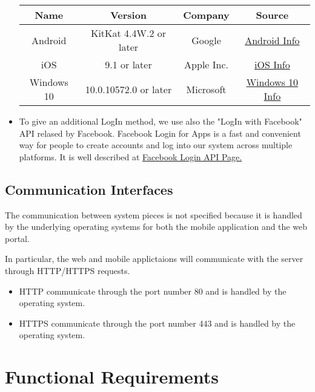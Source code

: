 \documentclass{report}
\begin{document}
\begin{itemize}
\begin{center}
\begin{table}[h!]
\begin{center}
								\begin{tabular}{cccc}
									\toprule
									\textbf{Name} & \textbf{Version} & \textbf{Company} & \textbf{Source}\\
									\midrule
									Android & KitKat 4.4W.2 or later & Google & \href{https://www.android.com}{Android Info}\\
									\midrule
									iOS & 9.1 or later & Apple Inc. & \href{http://www.apple.com/ios/}{iOS Info}\\
									\midrule
									Windows 10 & 10.0.10572.0 or later & Microsoft & \href{http://www.microsoft.com/it-it/mobile/windows10/?dcmpid=omc-org-globalsite.globalredirect}{Windows 10 Info}\\
									\bottomrule
								\end{tabular}
							\end{center}
							
						\end{table}
					\end{center}

				\item To give an additional LogIn method, we use also the "LogIn with Facebook" API relased by Facebook. Facebook Login for Apps is a fast and convenient way for people to create accounts and log into our system across multiple platforms. It is well described at \href{https://developers.facebook.com/docs/facebook-login}{Facebook Login API Page.}
			\end{itemize}


		\subsection{Communication Interfaces}
		The communication between system pieces is not specified because it is handled by the underlying operating systems for both the mobile application and the web portal.

		In particular, the web and mobile applictaions will communicate with the server through HTTP/HTTPS requests. 

			\begin{itemize}
				\item HTTP communicate through the port number 80 and is handled by the operating system. 
				\item HTTPS communicate through the port number 443 and is handled by the operating system.
			\end{itemize}

	\section{Functional Requirements}
\end{document}
